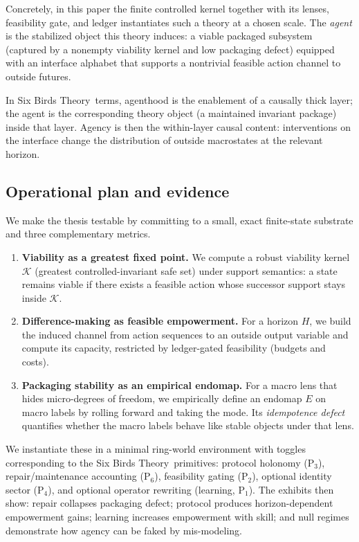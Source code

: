 \documentclass[11pt]{article}
\newcommand{\SBT}{Six Birds Theory}
\newcommand{\K}{\mathcal{K}}
\begin{document}
Concretely, in this paper the finite controlled kernel together with its lenses, feasibility gate, and ledger instantiates such a theory at a chosen scale. The \emph{agent} is the stabilized object this theory induces: a viable packaged subsystem (captured by a nonempty viability kernel and low packaging defect) equipped with an interface alphabet that supports a nontrivial feasible action channel to outside futures.

In \SBT\ terms, agenthood is the enablement of a causally thick layer; the agent is the corresponding theory object (a maintained invariant package) inside that layer. Agency is then the within-layer causal content: interventions on the interface change the distribution of outside macrostates at the relevant horizon.

\subsection{Operational plan and evidence}
We make the thesis testable by committing to a small, exact finite-state substrate and three complementary metrics.

\begin{enumerate}[leftmargin=*, itemsep=0.25em]
  \item \textbf{Viability as a greatest fixed point.} We compute a robust viability kernel $\K$ (greatest controlled-invariant safe set) under support semantics: a state remains viable if there exists a feasible action whose successor support stays inside $\K$.
  \item \textbf{Difference-making as feasible empowerment.} For a horizon $H$, we build the induced channel from action sequences to an outside output variable and compute its capacity, restricted by ledger-gated feasibility (budgets and costs).
  \item \textbf{Packaging stability as an empirical endomap.} For a macro lens that hides micro-degrees of freedom, we empirically define an endomap $E$ on macro labels by rolling forward and taking the mode. Its \emph{idempotence defect} quantifies whether the macro labels behave like stable objects under that lens.
\end{enumerate}

We instantiate these in a minimal ring-world environment with toggles corresponding to the \SBT\ primitives: protocol holonomy (P$_3$), repair/maintenance accounting (P$_6$), feasibility gating (P$_2$), optional identity sector (P$_4$), and optional operator rewriting (learning, P$_1$). The exhibits then show: repair collapses packaging defect; protocol produces horizon-dependent empowerment gains; learning increases empowerment with skill; and null regimes demonstrate how agency can be faked by mis-modeling.
\end{document}
